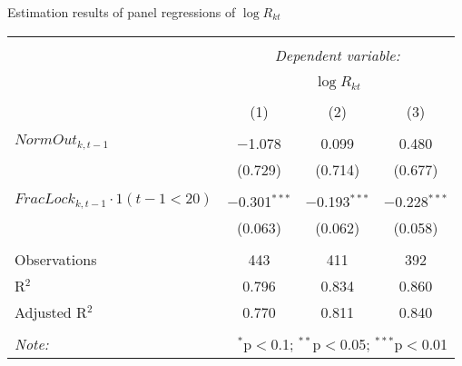   \caption{Estimation results of panel regressions of $\log R_{kt}$} 
  \label{} 
\small 
\begin{tabular}{@{\extracolsep{5pt}}lccc} 
\\[-1.8ex]\hline 
\hline \\[-1.8ex] 
 & \multicolumn{3}{c}{\textit{Dependent variable:}} \\ 
\cline{2-4} 
\\[-1.8ex] & \multicolumn{3}{c}{$\log R_{kt}$} \\ 
\\[-1.8ex] & (1) & (2) & (3)\\ 
\hline \\[-1.8ex] 
$NormOut_{k,t-1}$ & $-$1.078 & 0.099 & 0.480 \\ 
  & (0.729) & (0.714) & (0.677) \\ 
  & & & \\ 
$FracLock_{k,t-1}\cdot1(t-1<20)$ & $-$0.301$^{***}$ & $-$0.193$^{***}$ & $-$0.228$^{***}$ \\ 
  & (0.063) & (0.062) & (0.058) \\ 
\hline \\[-1.8ex] 
Observations & 443 & 411 & 392 \\ 
R$^{2}$ & 0.796 & 0.834 & 0.860 \\ 
Adjusted R$^{2}$ & 0.770 & 0.811 & 0.840 \\ 
\hline 
\hline \\[-1.8ex] 
\textit{Note:}  & \multicolumn{3}{r}{$^{*}$p$<$0.1; $^{**}$p$<$0.05; $^{***}$p$<$0.01} \\ 
\end{tabular} 